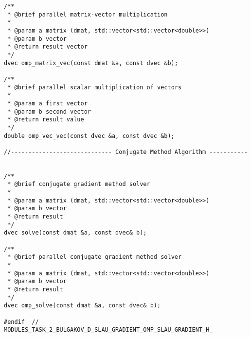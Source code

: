 \documentclass[14pt, russian]{extarticle}
\begin{document}
\begin{lstlisting}
/**
 * @brief parallel matrix-vector multiplication
 * 
 * @param a matrix (dmat, std::vector<std::vector<double>>)
 * @param b vector
 * @return result vector
 */
dvec omp_matrix_vec(const dmat &a, const dvec &b);

/**
 * @brief parallel scalar multiplication of vectors
 * 
 * @param a first vector
 * @param b second vector
 * @return result value 
 */
double omp_vec_vec(const dvec &a, const dvec &b);

//----------------------------- Conjugate Method Algorithm --------------------

/**
 * @brief conjugate gradient method solver
 * 
 * @param a matrix (dmat, std::vector<std::vector<double>>)
 * @param b vector
 * @return result 
 */
dvec solve(const dmat &a, const dvec& b);

/**
 * @brief parallel conjugate gradient method solver
 * 
 * @param a matrix (dmat, std::vector<std::vector<double>>)
 * @param b vector
 * @return result 
 */
dvec omp_solve(const dmat &a, const dvec& b);

#endif  // MODULES_TASK_2_BULGAKOV_D_SLAU_GRADIENT_OMP_SLAU_GRADIENT_H_
        \end{lstlisting}
\end{document}
